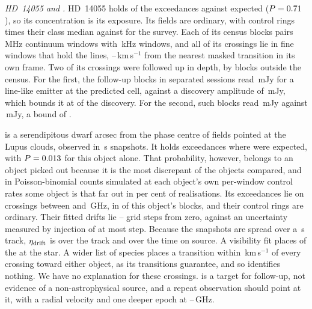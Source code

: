 \label{sec:twostars}%
\emph{HD~14055 and \BkAlmaName.} HD~14055 holds \TwNExcHD{} of the
exceedances against \TwExpCtrlHD{} expected ($P=0.71$), so its
concentration is its exposure. Its fields are ordinary, with control rings
\TwRingQHD{} times their class median against \TwRingQSurv{} for the survey.
Each of its \LrHdNBlk{} census blocks pairs \LrHdNCoarse{}
\LrHdCoarseChanMHz\,MHz continuum windows with \LrHdNFine{}
\LrHdFineChanKHz\,kHz windows, and all \LrHdNCross{} of its crossings lie in
fine windows that hold the \LrHdFineLines{} lines, \TwHDMaskLo--\TwHDMaskHi\,km\,s$^{-1}$ from the nearest masked
transition in its own frame. Two of its crossings were followed up in depth, by blocks outside the
census. For the first, the \TwHDNDeepSepFirst{} follow-up blocks in separated
sessions read \TwHDRepFirst\,mJy for a line-like emitter at the predicted
cell, against a discovery amplitude of \TwHDDiscFirst\,mJy, which bounds it
at \TwHDFracFirst{} of the discovery. For the second, \TwHDNDeepSepSecond{}
such blocks read \TwHDRepSecond\,mJy against \TwHDDiscSecond\,mJy, a bound
of \TwHDFracSecond.

\BkAlmaName{} is a serendipitous dwarf \TwPbJx{} arcsec from the phase
centre of fields pointed at the Lupus clouds, observed in \TwOnSrcJx\,s
snapshots. It holds \TwNExcJx{} exceedances where \TwExpCtrlJx{} were
expected, with $P=0.013$ for this object alone. That probability,
however, belongs to an object picked out because it is the most discrepant of
the \TwLookNStarCtrl{} objects compared, and in Poisson-binomial counts
simulated at each object's own per-window control rates some object is that
far out in \TwLookPctCtrl{} per cent of realisations. Its
\TwNExcJxWord{} exceedances lie on \TwJxNCrossExcWord{} crossings between
\TwJxExcBandLo{} and \TwJxExcBandHi\,GHz, in \TwJxNBlockExcWord{} of this
object's \TwJxNBlockWord{} blocks, and their control rings are ordinary.
Their fitted drifts lie \TwJxStepLo--\TwJxStepHi{} grid steps from zero,
against an uncertainty measured by injection of at most \TwJxStepErr{} step.
Because the snapshots are spread over a \TwJxSpanS\,s track,
$\eta_{\rm drift}$ is \TwJxEtaSpanRange{} over the track and \TwJxEtaOnRange{}
over the time on source. A visibility fit places \TwJxNLocalExcWord{} of the
\TwJxNCrossExcWord{} at the star. A wider list of \TwWideNSpecies{} species
places a transition within \TwWideDvMax\,km\,s$^{-1}$ of every crossing
toward either object, as its \TwWideNTrans{} transitions guarantee, and so
identifies nothing. We have no explanation for these crossings. \BkAlmaName{}
is a target for follow-up, not evidence of a non-astrophysical source, and a
repeat observation should point at it, with a radial velocity and one deeper
epoch at \TwJxExcBandLo--\TwJxExcBandHi\,GHz.

